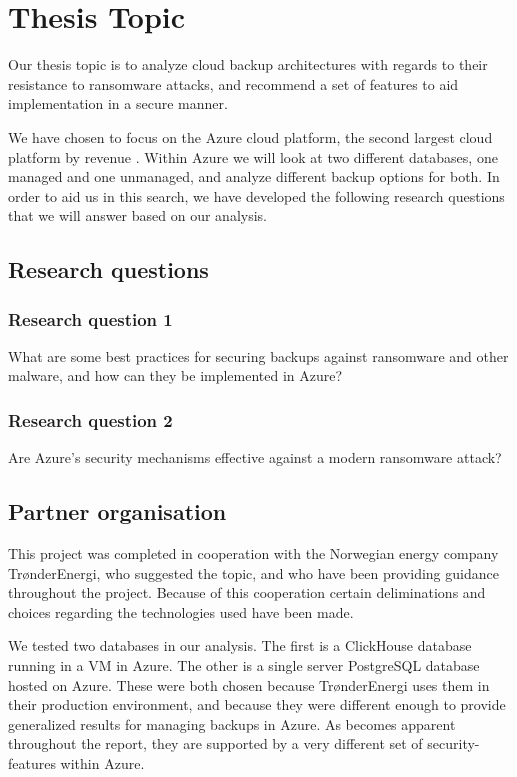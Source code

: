 \section{Thesis Topic} 
Our thesis topic is to analyze cloud backup architectures with regards to their resistance to ransomware attacks, and recommend a set of features to aid implementation in a secure manner. 

We have chosen to focus on the Azure cloud platform, the second largest cloud platform by revenue \cite{richter_amazon_2022}. Within Azure we will look at two different databases, one managed and one unmanaged, and analyze different backup options for both. In order to aid us in this search, we have developed the following research questions that we will answer based on our analysis.
\subsection{Research questions} \label{RQ}
\subsubsection{Research question 1}
What are some  best practices for securing backups against ransomware and other malware, and how can they be implemented in Azure?
\subsubsection{Research question 2}
Are Azure's security mechanisms effective against a modern ransomware attack?



\subsection{Partner organisation}
This project was completed in cooperation with the Norwegian energy company TrønderEnergi, who suggested the topic, and who have been providing guidance throughout the project. Because of this cooperation certain deliminations and choices regarding the technologies used have been made. 

We tested two databases in our analysis. The first is a ClickHouse database running in a VM in Azure. The other is a single server PostgreSQL database hosted on Azure. These were both chosen because TrønderEnergi uses them in their production environment, and because they were different enough to provide generalized results for managing backups in Azure. As becomes apparent throughout the report, they are supported by a very different set of security-features within Azure. 

